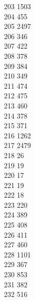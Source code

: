 { 203	1503 \\
 204	455 \\
 205	2497 \\
 206	346 \\
 207	422 \\
 208	378 \\
 209	384 \\
 210	349 \\
 211	474 \\
 212	475 \\
 213	460 \\
 214	378 \\
 215	371 \\
 216	1262 \\
 217	2479 \\
 218	26 \\
 219	19 \\
 220	17 \\
 221	19 \\
 222	18 \\
 223	220 \\
 224	389 \\
 225	408 \\
 226	411 \\
 227	460 \\
 228	1101 \\
 229	367 \\
 230	853 \\
 231	382 \\
 232	516 \\
}
